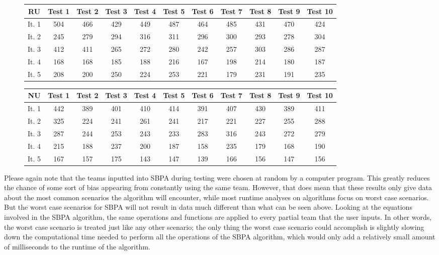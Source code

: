 \documentclass{article}
\begin{document}
\begin{figure}[H]
	\begin{tabular}{c||c|c|c|c|c|c|c|c|c|c}
		RU&Test 1&Test 2&Test 3&Test 4&Test 5&Test 6&Test 7&Test 8&Test 9&Test 10\\
		\hline\hline
		It. 1&504&466&429&449&487&464&485&431&470&424\\
		It. 2&245&279&294&316&311&296&300&293&278&304\\
		It. 3&412&411&265&272&280&242&257&303&286&287\\
		It. 4&168&168&185&188&216&167&198&214&180&187\\
		It. 5&208&200&250&224&253&221&179&231&191&235\\
	\end{tabular}
	\centering
\end{figure}
\begin{figure}[H]
	\begin{tabular}{c||c|c|c|c|c|c|c|c|c|c}
		NU&Test 1&Test 2&Test 3&Test 4&Test 5&Test 6&Test 7&Test 8&Test 9&Test 10\\
		\hline\hline
		It. 1&442&389&401&410&414&391&407&430&389&411\\
		It. 2&325&224&241&261&241&217&221&227&255&288\\
		It. 3&287&244&253&243&233&283&316&243&272&279\\
		It. 4&215&188&237&200&187&158&235&179&168&190\\
		It. 5&167&157&175&143&147&139&166&156&147&156\\
	\end{tabular}
	\centering
\end{figure}
Please again note that the teams inputted into SBPA during testing were chosen at random by a computer program. This greatly reduces the chance of some sort of bias appearing from constantly using the same team. However, that does mean that these results only give data about the most common scenarios the algorithm will encounter, while most runtime analyses on algorithms focus on worst case scenarios. But the worst case scenarios for SBPA will not result in data much different than what can be seen above. Looking at the equations involved in the SBPA algorithm, the same operations and functions are applied to every partial team that the user inputs. In other words, the worst case scenario is treated just like any other scenario; the only thing the worst case scenario could accomplish is slightly slowing down the computational time needed to perform all the operations of the SBPA algorithm, which would only add a relatively small amount of milliseconds to the runtime of the algorithm.\\\\
\end{document}
